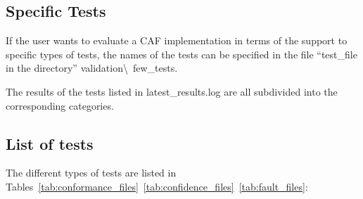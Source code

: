 \subsection{Specific Tests}
If the user wants to evaluate a CAF implementation in terms of
the support to specific types of tests, the names of the tests
can be specified in the file ``test\_file in the directory''
validation\textbackslash~few\_tests.

The results of the tests listed in latest\_results.log are all
subdivided into the corresponding categories.


\subsection{List of tests}

The different types of tests are listed in 
Tables~\ref{tab:conformance_files}~\ref{tab:confidence_files}~\ref{tab:fault_files}:

